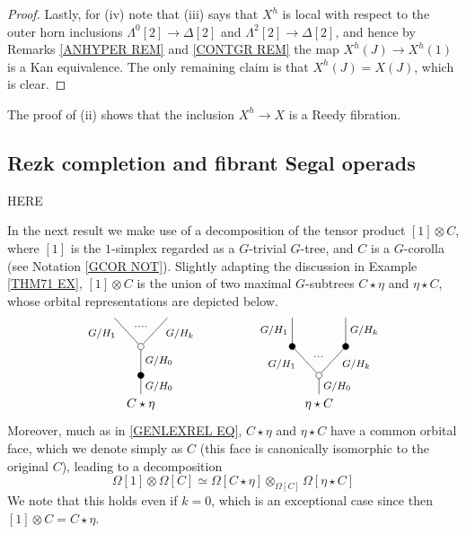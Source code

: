 \documentclass[a4paper,10pt
,draft
]{article}%
\begin{document}
\begin{proof}
Lastly, for (iv) note that (iii) says that $X^h$ is local with respect to the outer horn inclusions
$\Lambda^0[2] \to \Delta[2]$ and
$\Lambda^2[2] \to \Delta[2]$, 
and hence by Remarks 
\ref{ANHYPER REM} and \ref{CONTGR REM}
the map 
$X^h(J) \to X^h(1)$ 
is a Kan equivalence.
The only remaining claim is that
$X^h(J) = X(J)$, which is clear.
\end{proof}

\begin{remark}
The proof of (ii) shows that the inclusion $X^h \to X$ is a Reedy fibration.
\end{remark}

\subsection{Rezk completion and fibrant Segal operads}
\label{REZKCOMP SEC}

{\color{red} HERE}

In the next result we make use of a decomposition of the tensor product $[1] \otimes C$,
where $[1]$ is the $1$-simplex regarded as a $G$-trivial $G$-tree, and $C$ is a $G$-corolla 
(see Notation \ref{GCOR NOT}). Slightly adapting the discussion
in Example \ref{THM71 EX}, $[1] \otimes C$ is the union of two maximal $G$-subtrees $C \star \eta$ and $\eta \star C$,
whose orbital representations are depicted below.
\[
\begin{tikzpicture}
[grow=up,auto,level distance=2.3em,every node/.style = {font=\footnotesize},dummy/.style={circle,draw,inner sep=0pt,minimum size=1.75mm}]
	\node at (0,0) [font=\normalsize] {$C \star \eta$}
		child{node [dummy,fill=black] {}
			child{node [dummy] {}
				child{
				edge from parent node [swap,near end] {$G/H_k$} node [name=Kn] {}}
				child{
				edge from parent node [near end] {$G/H_1$}
node [name=Kone,swap] {}}
			edge from parent node [swap] {$G/H_0$}}
		edge from parent node [swap] {$G/H_0$}};
		\draw [dotted,thick] (Kone) -- (Kn) ;
	\node at (5,0) [font=\normalsize] {$\eta \star C$}
		child{node [dummy] {}
			child{node [dummy,fill=black] {}
				child{
				edge from parent node [swap] {$G/H_k$}}
			edge from parent node [swap,near end] {$G/H_k$} node [name=Kn] {}}
			child{node [dummy,fill=black] {}
				child{
				edge from parent node {$G/H_1$}}
			edge from parent node [near end] {$G/H_1$}
node [name=Kone,swap] {}}
		edge from parent node [swap] {$G/H_0$}
		};
		\draw [dotted,thick] (Kone) -- (Kn) ;
\end{tikzpicture}
\]
Moreover, much as in \eqref{GENLEXREL EQ}, 
$C \star \eta$ and $\eta \star C$ have a common orbital face, which we denote simply as $C$
(this face is canonically isomorphic to the original $C$),
leading to a decomposition
\[
\Omega[1] \otimes \Omega[C]
	\simeq
\Omega[C \star \eta] \otimes_{\Omega[C]} \Omega[\eta \star C]
\]
We note that this holds even if $k=0$, 
which is an exceptional case since then
$[1] \otimes C = C \star \eta$.
\end{document}
